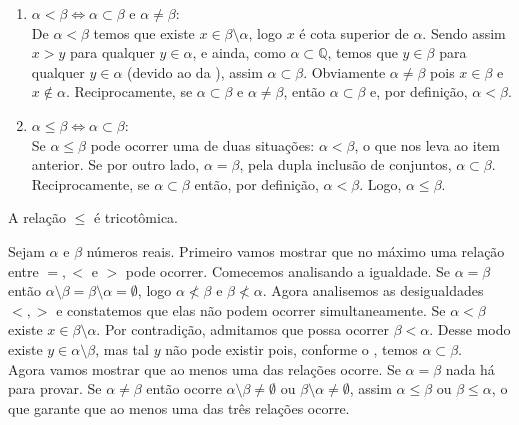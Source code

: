 \documentclass[../main.tex]{subfiles}
\begin{document}
\begin{dem}
    \begin{enumerate}[label=(\roman*)]
        \item\label{reais-dummy-subset} $\alpha < \beta \iff \alpha \subset \beta$ e $\alpha \neq \beta$: \\
        De $\alpha < \beta$ temos que existe $x \in \beta \setminus \alpha$, logo $x$ é cota superior de $\alpha$. Sendo assim $x > y$ para qualquer $y \in \alpha$, e ainda, como $\alpha \subset \mathbb{Q}$, temos que $y \in \beta$ para qualquer $y \in \alpha$ (devido ao  da ), assim $\alpha \subset \beta$. Obviamente $\alpha \neq \beta$ pois $x \in \beta$ e $x \not\in \alpha$.
        Reciprocamente, se $\alpha \subset \beta$ e $\alpha \neq \beta$, então $\alpha \subset \beta$ e, por definição, $\alpha < \beta$.
        
        \item $\alpha \leq \beta \iff \alpha \subset \beta$: \\
        Se $\alpha \leq \beta$ pode ocorrer uma de duas situações: $\alpha < \beta$, o que nos leva ao item anterior. Se por outro lado, $\alpha = \beta$, pela dupla inclusão de conjuntos, $\alpha \subset \beta$. 
        Reciprocamente, se $\alpha \subset \beta$ então, por definição, $\alpha < \beta$. Logo, $\alpha \leq \beta$.
    \end{enumerate}
\end{dem}

\begin{teo}\label{reais-teo-ordemTricotomica}
    A relação $\leq$ é tricotômica.
\end{teo}
\begin{dem}
    Sejam $\alpha$ e $\beta$ números reais.
    Primeiro vamos mostrar que no máximo uma relação entre $=, <$ e $>$ pode ocorrer.
    Comecemos analisando a igualdade. Se $\alpha = \beta$ então $\alpha \setminus \beta = \beta \setminus \alpha = \emptyset$, logo $\alpha \not< \beta$ e $\beta \not< \alpha$.
    Agora analisemos as desigualdades $<, >$ e constatemos que elas não podem ocorrer simultaneamente. Se $\alpha < \beta$ existe $x \in \beta \setminus \alpha$. Por contradição, admitamos que possa ocorrer $\beta < \alpha$. Desse modo existe $y \in \alpha \setminus \beta$, mas tal $y$ não pode existir pois, conforme o , temos $\alpha \subset \beta$. \\

    Agora vamos mostrar que ao menos uma das relações ocorre. Se $\alpha = \beta$ nada há para provar. Se $\alpha \neq \beta$ então ocorre $\alpha \setminus \beta \neq \emptyset$ ou $\beta \setminus \alpha \neq \emptyset$, assim $\alpha \leq \beta$ ou $\beta \leq \alpha$, o que garante que ao menos uma das três relações ocorre.
\end{dem}
\end{document}
